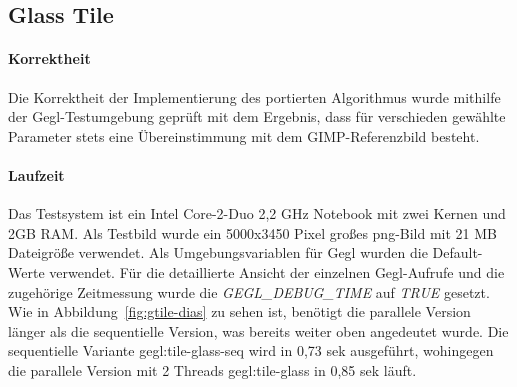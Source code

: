 \subsection{Glass Tile}
\paragraph{Korrektheit}
Die Korrektheit der Implementierung des portierten Algorithmus wurde mithilfe der Gegl-Testumgebung geprüft mit dem Ergebnis, dass für verschieden gewählte Parameter stets eine Übereinstimmung mit dem GIMP-Referenzbild besteht.

\paragraph{Laufzeit}
Das Testsystem ist ein Intel Core-2-Duo 2,2 GHz Notebook mit zwei Kernen und 2GB RAM. Als Testbild wurde ein 5000x3450 Pixel großes png-Bild mit 21 MB Dateigröße verwendet.
Als Umgebungsvariablen für Gegl wurden die Default-Werte verwendet. Für die detaillierte Ansicht der einzelnen Gegl-Aufrufe und die zugehörige Zeitmessung wurde die \emph{GEGL\_DEBUG\_TIME} auf \emph{TRUE} gesetzt. Wie in Abbildung~\ref{fig:gtile-dias} zu sehen ist, benötigt die parallele Version länger als die sequentielle Version, was bereits weiter oben angedeutet wurde. Die sequentielle Variante gegl:tile-glass-seq wird in 0,73 sek ausgeführt, wohingegen die parallele Version mit 2 Threads gegl:tile-glass in 0,85 sek läuft.

